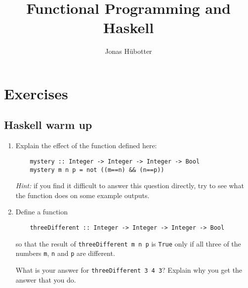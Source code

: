 \documentclass{article}
\title{Functional Programming and Haskell}
\author{Jonas Hübotter}
\begin{document}
\maketitle

\section{Exercises}

\subsection{Haskell warm up}
\begin{enumerate}
\item \cite[p. 46]{thompson} Explain the effect of the function defined here:
\begin{verbatim}
    mystery :: Integer -> Integer -> Integer -> Bool
    mystery m n p = not ((m==n) && (n==p))
\end{verbatim}
\textit{Hint:} if you find it difficult to answer this question directly, try to see what the function does on some example outputs.

\item \cite[p. 47]{thompson} Define a function
\begin{verbatim}
    threeDifferent :: Integer -> Integer -> Integer -> Bool
\end{verbatim}
so that the result of \verb|threeDifferent m n p| is \verb|True| only if all three of the numbers \verb|m|, \verb|n| and \verb|p| are different. \par
What is your answer for \verb|threeDifferent 3 4 3|? Explain why you get the answer that you do.
\end{enumerate}
\end{document}
